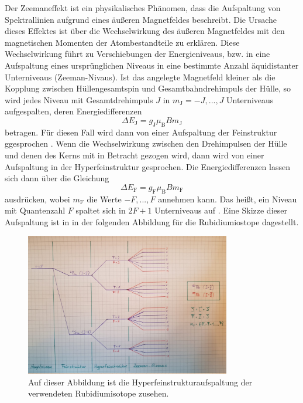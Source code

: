 Der Zeemaneffekt ist ein physikalisches Phänomen, dass die Aufspaltung von
Spektrallinien aufgrund eines äußeren Magnetfeldes beschreibt. Die Ursache dieses 
Effektes ist über die Wechselwirkung des äußeren Magnetfeldes mit den magnetischen 
Momenten der Atombestandteile zu erklären. Diese Wechselwirkung führt zu 
Verschiebungen der Energieniveaus, bzw. in eine Aufspaltung eines ursprünglichen 
Niveaus in eine bestimmte Anzahl äquidistanter Unterniveaus (Zeeman-Nivaus). 
Ist das angelegte Magnetfeld kleiner als die Kopplung zwischen Hüllengesamtspin 
und Gesamtbahndrehimpuls der Hülle, so wird jedes Niveau mit 
Gesamtdrehimpuls $J$ in $m_{\text{J}}= -J,...,J$ Unterniveaus aufgespalten, deren 
Energiedifferenzen
\begin{equation}
    \Delta E_{\text{J}} = g_{\text{J}} \mu_{\text{B}} B m_{\text{J}}
\end{equation}
betragen. Für diesen Fall wird dann von einer Aufspaltung der Feinstruktur ggesprochen \cite{1}.
Wenn die Wechselwirkung zwischen den Drehimpulsen der Hülle und denen des Kerns 
mit in Betracht gezogen wird, dann wird von einer Aufspaltung in der Hyperfeinstruktur
gesprochen. Die Energiedifferenzen lassen sich dann über die Gleichung 
\begin{equation}
    \Delta E_{\text{F}} = g_{\text{F}} \mu_{\text{B}} B m_{\text{F}}
\end{equation}
ausdrücken, wobei $m_{\text{F}}$ die Werte $-F,...,F$ annehmen kann.
Das heißt, ein Niveau mit Quantenzahl $F$ spaltet sich in $2F+1$ Unterniveaus auf \cite{2}.
Eine Skizze dieser Aufspaltung ist in in der folgenden Abbildung für 
die Rubidiumiostope dagestellt.
\begin{figure}
    \centering
    \includegraphics[width=0.8\textwidth]{figure/Zeemanniveaus.pdf}
    \caption{Auf dieser Abbildung ist die Hyperfeinstrukturaufspaltung der 
    verwendeten Rubidiumisotope zusehen.}
    \label{abb1}
\end{figure}


